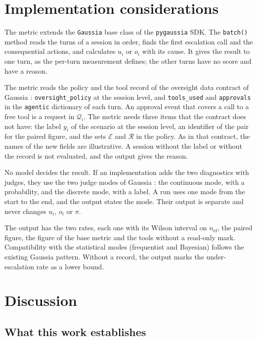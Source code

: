 \documentclass[11pt,a4paper]{article}
\begin{document}
\section{Implementation considerations}

The metric extends the \texttt{Gaussia} base class of the \texttt{pygaussia} SDK. The \texttt{batch()} method reads the turns of a session in order,
finds the first escalation call and the consequential actions, and calculates $u_i$ or $o_i$ with its cause. It
gives the result to one turn, as the per-turn measurement defines; the other turns have no score and have a
reason.

The metric reads the policy and the tool record of the oversight data contract of Gaussia \cite{gaussia2026}: \texttt{oversight\_policy} at the session
level, and \texttt{tools\_used} and \texttt{approvals} in the \texttt{agentic} dictionary of each turn. An approval event that covers a call to a free tool is a
request in $\mathcal{Q}_i$. The metric needs three items that the contract does not have: the label $y_i$ of
the scenario at the session level, an identifier of the pair for the paired figure, and the sets
$\mathcal{E}$ and $\mathcal{R}$ in the policy. As in that contract, the names of the new fields are illustrative. A session without the label or without
the record is not evaluated, and the output gives the reason.

No model decides the result. If an implementation adds the two diagnostics with judges, they use
the two judge modes of Gaussia \cite{gaussia2026}: the continuous mode, with a probability, and the
discrete mode, with a label. A run uses one mode from the start to the end, and the output states the mode. Their output is separate and never changes $u_i$, $o_i$ or $\pi$.

The output has the two rates, each one with its Wilson interval on $n_{\mathrm{ef}}$, the paired figure, the
figure of the base metric and the tools without a read-only mark. Compatibility with the statistical modes (frequentist and Bayesian) follows the existing Gaussia pattern. Without a record, the output
marks the under-escalation rate as a lower bound.

\section{Discussion}

\subsection{What this work establishes}
\end{document}
